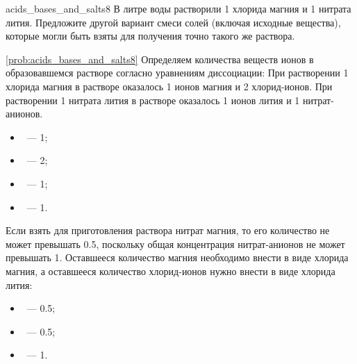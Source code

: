 \begin{problem}{}{acids_bases_and_salts8}
    В литре воды растворили \qty{1}{\ruMole} хлорида магния и \qty{1}{\ruMole} нитрата лития. Предложите другой вариант смеси солей (включая исходные вещества), которые могли быть взяты для получения точно такого же раствора.
    \begin{sol}{\ref{prob:acids_bases_and_salts8}}
        Определяем количества веществ ионов в образовавшемся растворе согласно уравнениям диссоциации:
        При растворении \qty{1}{\ruMole} хлорида магния в растворе оказалось \qty{1}{\ruMole} ионов магния и \qty{2}{\ruMole} хлорид-ионов. При растворении \qty{1}{\ruMole} нитрата лития в растворе оказалось \qty{1}{\ruMole} ионов лития и \qty{1}{\ruMole} нитрат-анионов.
        \begin{itemize}
            \item {}~--- \qty{1}{\ruMole};
            \item {}~--- \qty{2}{\ruMole};
            \item {}~--- \qty{1}{\ruMole};
            \item {}~--- \qty{1}{\ruMole}.
        \end{itemize}
        Если взять для приготовления раствора нитрат магния, то его количество не может превышать \qty{0,5}{\ruMole}, поскольку общая концентрация нитрат-анионов не может превышать \qty{1}{\ruMole}. Оставшееся количество магния необходимо внести в виде хлорида магния, а оставшееся количество хлорид-ионов нужно внести в виде хлорида лития:
        \begin{itemize}
            \item {}~--- \qty{0,5}{\ruMole};
            \item {}~--- \qty{0,5}{\ruMole};
            \item {}~--- \qty{1}{\ruMole}.
        \end{itemize}
    \end{sol}
\end{problem}

